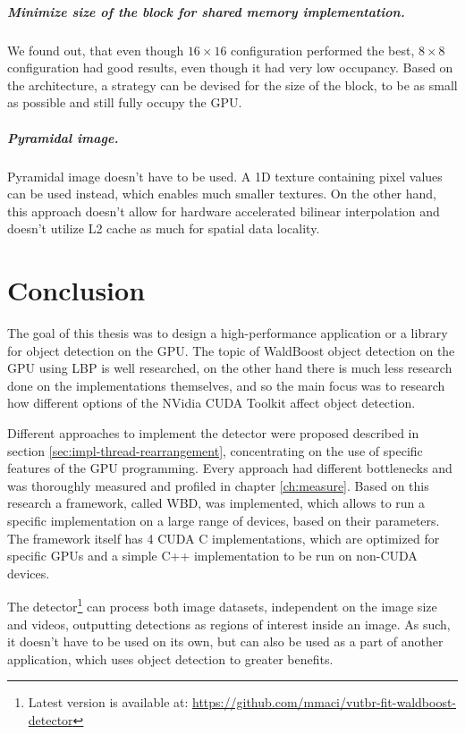 \paragraph{Minimize size of the block for shared memory implementation.} We found out, that even though $16 \times 16$ configuration performed the best, $8 \times 8$ configuration had good results, even though it had very low occupancy. Based on the architecture, a strategy can be devised for the size of the block, to be as small as possible and still fully occupy the GPU.

\paragraph{Pyramidal image.} Pyramidal image doesn't have to be used. A 1D texture containing pixel values can be used instead, which enables much smaller textures. On the other hand, this approach doesn't allow for hardware accelerated bilinear interpolation and doesn't utilize L2 cache as much for spatial data locality.


\chapter{Conclusion}

The goal of this thesis was to design a high-performance application or a library for object detection on the GPU. The topic of WaldBoost object detection on the GPU using LBP is well researched, on the other hand there is much less research done on the implementations themselves, and so the main focus was to research how different options of the NVidia CUDA Toolkit affect object detection.

Different approaches to implement the detector were proposed described in section \ref{sec:impl-thread-rearrangement}, concentrating on the use of specific features of the GPU programming. Every approach had different bottlenecks and was thoroughly measured and profiled in chapter \ref{ch:measure}. Based on this research a framework, called WBD, was implemented, which allows to run a specific implementation on a large range of devices, based on their parameters. The framework itself has 4 CUDA C implementations, which are optimized for specific GPUs and a simple C++ implementation to be run on non-CUDA devices.

The detector\footnote{Latest version is available at: \url{https://github.com/mmaci/vutbr-fit-waldboost-detector}} can process both image datasets, independent on the image size and videos, outputting detections as regions of interest inside an image. As such, it doesn't have to be used on its own, but can also be used as a part of another application, which uses object detection to greater benefits.

